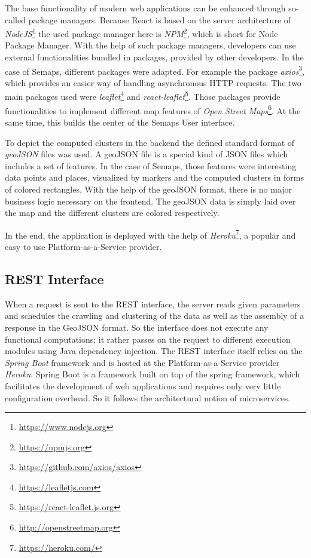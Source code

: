 The base functionality of modern web applications can be enhanced through so-called package managers. Because React is based on the server architecture of \textit{NodeJS}\footnote{ \url{https://www.nodejs.org}} the used package manager here is \textit{NPM}\footnote{ \url{https://npmjs.org}}, which is short for Node Package Manager. With the help of such package managers, developers can use external functionalities bundled in packages, provided by other developers. In the case of Semaps, different packages were adapted. For example the package \textit{axios}\footnote{ \url{https://github.com/axios/axios}}, which provides an easier way of handling asynchronous HTTP requests. The two main packages used were \textit{leaflet}\footnote{ \url{https://leafletjs.com}} and \textit{react-leaflet}\footnote{ \url{https://react-leaflet.js.org}}. Those packages provide functionalities to implement different map features of \textit{Open Street Maps}\footnote{ \url{http://openstreetmap.org}}. At the same time, this builds the center of the Semaps User interface.

To depict the computed clusters in the backend the defined standard format of \textit{geoJSON} files was used. A geoJSON file is a special kind of JSON files which includes a set of features. In the case of Semaps, those features were interesting data points and places, visualized by markers and the computed clusters in forms of colored rectangles. With the help of the geoJSON format, there is no major business logic necessary on the frontend. The geoJSON data is simply laid over the map and the different clusters are colored respectively.

In the end, the application is deployed with the help of \textit{Heroku}\footnote{\url{https://heroku.com/}}, a popular and easy to use Platform-as-a-Service provider.

\subsection{REST Interface}
When a request is sent to the REST interface, the server reads given parameters and schedules the crawling and clustering of the data as well as the assembly of a response in the GeoJSON format. So the interface does not execute any functional computations; it rather passes on the request to different execution modules using Java dependency injection. The REST interface itself relies on the \textit{Spring Boot} framework and is hosted at the Platform-as-a-Service provider \textit{Heroku}. Spring Boot is a framework built on top of the spring framework, which facilitates the development of web applications and requires only very little configuration overhead. So it follows the architectural notion of microservices. 



